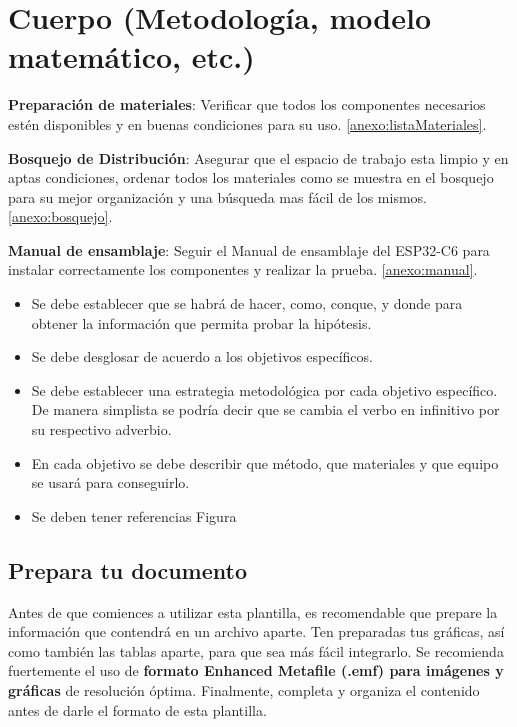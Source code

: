     \section{Cuerpo (Metodología, modelo matemático, etc.)}
    
        \textbf{Preparación de materiales}: Verificar que todos los componentes necesarios estén disponibles y en buenas condiciones para su uso. \ref{anexo:listaMateriales}.
    
        \textbf{Bosquejo de Distribución}: Asegurar que el espacio de trabajo esta limpio y en aptas condiciones, ordenar todos los materiales como se muestra en el bosquejo para su mejor organización y una búsqueda mas fácil de los mismos. \ref{anexo:bosquejo}.
    
        \textbf{Manual de ensamblaje}: Seguir el Manual de ensamblaje del ESP32-C6 para instalar correctamente los componentes y realizar la prueba. \ref{anexo:manual}.
    
    
    \begin{itemize}
        \item Se debe establecer que se habrá de hacer, como, conque, y donde para obtener la información que permita probar la hipótesis.  
        \item Se debe desglosar de acuerdo a los objetivos específicos. 
        \item Se debe establecer una estrategia metodológica por cada objetivo específico. De manera simplista se podría decir que se cambia el verbo en infinitivo por su respectivo adverbio.
        \item En cada objetivo se debe describir que método, que materiales y que equipo se usará para conseguirlo.
        \item Se deben tener referencias Figura %
    \end{itemize}
    
    \subsection{Prepara tu documento}
    
    Antes de que comiences a utilizar esta plantilla, es recomendable que prepare la información que contendrá en un archivo aparte. 
    Ten preparadas tus gráficas, así como también las tablas aparte, para que sea más fácil integrarlo. 
    Se recomienda fuertemente el uso de \textbf{formato Enhanced Metafile (.emf) para imágenes y gráficas} de resolución óptima. 
    Finalmente, completa y organiza el contenido antes de darle el formato de esta plantilla. 
    
